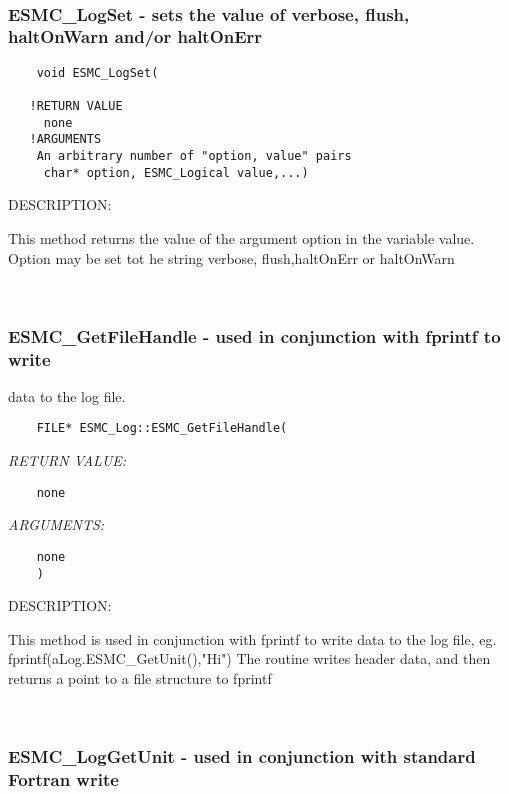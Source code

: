 \mbox{}\hrulefill\ 
 
\subsubsection [ESMC\_LogSet] {ESMC\_LogSet - sets the value of verbose, flush, haltOnWarn and/or haltOnErr}


  
\begin{verbatim}    void ESMC_LogSet(
 
   !RETURN VALUE 
     none
   !ARGUMENTS
    An arbitrary number of "option, value" pairs
     char* option, ESMC_Logical value,...) \end{verbatim}
{\sf DESCRIPTION:\\ }


   This method returns the value of the argument option in the variable value.
   Option may be set tot he string verbose, flush,haltOnErr or haltOnWarn 
 
\mbox{}\hrulefill\ 
 
\subsubsection [ESMC\_GetFileHandle] {ESMC\_GetFileHandle - used in conjunction with fprintf to write}


   data to the log file.
  
\begin{verbatim}    FILE* ESMC_Log::ESMC_GetFileHandle(\end{verbatim}{\em RETURN VALUE:}
\begin{verbatim}    none\end{verbatim}{\em ARGUMENTS:}
\begin{verbatim}    none
    )\end{verbatim}
{\sf DESCRIPTION:\\ }


   This method is used in conjunction with fprintf 
   to write data to the log file, eg. fprintf(aLog.ESMC\_GetUnit(),"Hi")
   The routine writes header data, and
   then returns a point to a file structure to fprintf
   
 
\mbox{}\hrulefill\ 
 
\subsubsection [ESMC\_LogGetUnit] {ESMC\_LogGetUnit - used in conjunction with standard Fortran write}


